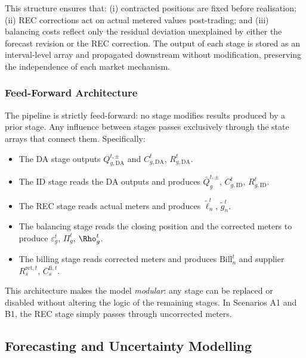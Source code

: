 \documentclass[12pt,a4paper]{article}
\begin{document}
\noindent
This structure ensures that: (i) contracted positions are fixed before
realisation; (ii) REC corrections act on actual metered values post-trading;
and (iii) balancing costs reflect only the residual deviation unexplained by
either the forecast revision or the REC correction.  The output of each stage
is stored as an interval-level array and propagated downstream without
modification, preserving the independence of each market mechanism.

\subsubsection{Feed-Forward Architecture}

The pipeline is strictly feed-forward: no stage modifies results produced by
a prior stage.  Any influence between stages passes exclusively through the
state arrays that connect them.  Specifically:

\begin{itemize}
  \item The DA stage outputs $Q_{g,\mathrm{DA}}^{t,\pm}$ and
        $C_{g,\mathrm{DA}}^{t}$, $R_{g,\mathrm{DA}}^{t}$.
  \item The ID stage reads the DA outputs and produces
        $\bar{Q}_{g}^{t,\pm}$, $C_{g,\mathrm{ID}}^{t}$, $R_{g,\mathrm{ID}}^{t}$.
  \item The REC stage reads actual meters and produces
        $\tilde{\ell}_{n}^{t}$, $\tilde{g}_{n}^{t}$.
  \item The balancing stage reads the closing position and the corrected
        meters to produce $\varepsilon_{g}^{t}$, $\Pi_{g}^{t}$, $\Rho_{g}^{t}$.
  \item The billing stage reads corrected meters and produces
        $\text{Bill}_{n}^{t}$ and supplier $R_{s}^{\mathrm{ret},t}$,
        $C_{s}^{\mathrm{fi},t}$.
\end{itemize}

This architecture makes the model \emph{modular}: any stage can be replaced
or disabled without altering the logic of the remaining stages.  In Scenarios
A1 and B1, the REC stage simply passes through uncorrected meters.

\subsection{Forecasting and Uncertainty Modelling}
\label{subsec:forecasting}
\end{document}
